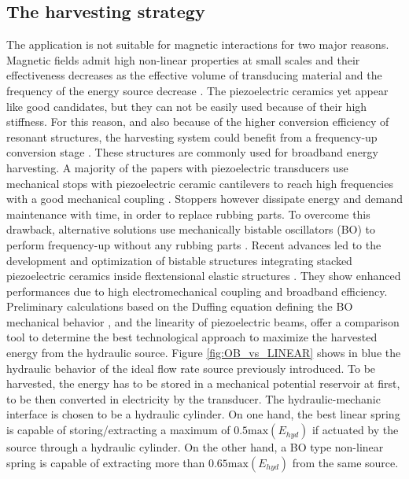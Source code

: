 \documentclass[3p,twocolumn,preprint]{elsarticle}
\begin{document}
	\subsection{The harvesting strategy}	
	\label{The harvesting strategy}
The application is not suitable for magnetic interactions for two major reasons. Magnetic fields admit high non-linear properties at small scales and their effectiveness decreases as the effective volume of transducing material and the frequency of the energy source decrease \cite{Priya2017,Kulah2008}. The piezoelectric ceramics yet appear like good candidates, but they can not be easily used because of their high stiffness. For this reason, and also because of the higher conversion efficiency of resonant structures, the harvesting system could benefit from a frequency-up conversion stage \cite{Ashraf2011,Peng2021}. These structures are commonly used for broadband energy harvesting. A majority of the papers with piezoelectric transducers use mechanical stops with piezoelectric ceramic cantilevers to reach high frequencies with a good mechanical coupling \cite{Edwards2013,Gu2011,Lee2007}. Stoppers however dissipate energy and demand maintenance with time, in order to replace rubbing parts. To overcome this drawback, alternative solutions use mechanically bistable oscillators (BO) to perform frequency-up without any rubbing parts \cite{Vocca2012}. Recent advances 
led to the development and optimization of  bistable structures integrating stacked piezoelectric ceramics inside flextensional elastic structures \cite{Huguet2017}. They show enhanced performances due to high electromechanical coupling and broadband efficiency.
Preliminary calculations based on the Duffing equation defining the BO mechanical behavior \cite{Tseng1971}, and the linearity of piezoelectric beams, offer a comparison tool to determine the best technological approach to maximize the harvested energy from the hydraulic source. Figure \ref{fig:OB_vs_LINEAR} shows in blue the hydraulic behavior of the ideal flow rate source previously introduced. To be harvested, the energy has to be stored in a mechanical potential reservoir at first, to be then converted in electricity by the transducer. The hydraulic-mechanic interface is chosen to be a hydraulic cylinder. On one hand, the best linear spring is capable of storing/extracting a maximum of $0.5\text{max}(E_{hyd})$ if actuated by the source through a hydraulic cylinder. On the other hand, a BO type non-linear spring is capable of extracting more than $0.65\text{max}(E_{hyd})$ from the same source.
\end{document}
